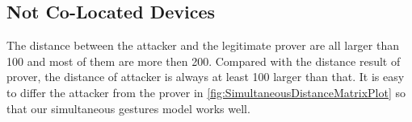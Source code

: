 \subsection{Not Co-Located Devices}
The distance between the attacker and the legitimate prover are all larger than 100 and most of them are more then 200. Compared with the distance result of prover, the distance of attacker is always at least 100 larger than that. It is easy to differ the attacker from the prover in  \autoref{fig:SimultaneousDistanceMatrixPlot} so that our simultaneous gestures model works well. 






 


